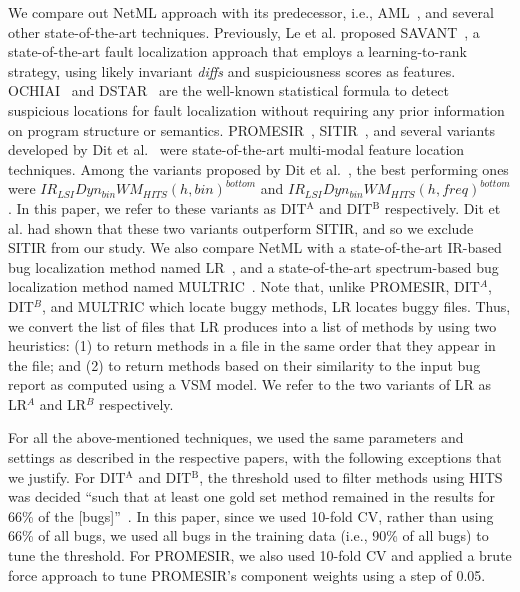 We compare out NetML approach with its predecessor, i.e., AML~\cite{Le:2015:IRS:2786805.2786880}, and several other state-of-the-art techniques. Previously, Le et al. proposed SAVANT~\cite{B.Le:2016:LBF:2931037.2931049}, a state-of-the-art fault localization approach that employs a learning-to-rank~\cite{svmrank} strategy, using likely invariant \textit{diffs} and suspiciousness scores as features. OCHIAI~\cite{Abreu:2007:ASF:1308173.1308264} and DSTAR~\cite{DBLP:journals/tr/WongDGL14} are the well-known statistical formula to detect suspicious locations for fault localization without requiring any prior information on program structure or semantics. PROMESIR~\cite{PoshyvanykGMAR07}, SITIR~\cite{LiuMPR07}, and several variants developed by Dit et al.~\cite{DitRP13} were state-of-the-art multi-modal feature location techniques. Among the variants proposed by Dit et al.~\cite{DitRP13}, the best performing ones were $IR_{LSI}Dyn_{bin}WM_{HITS}(h,bin)^{bottom}$ and  $IR_{LSI}Dyn_{bin}WM_{HITS}(h,freq)^{bottom}$. In this paper, we refer to these variants as DIT$^\text{A}$ and DIT$^\text{B}$ respectively. Dit et al. had shown that these two variants outperform SITIR, and so we exclude SITIR from our study. We also compare NetML with a state-of-the-art IR-based bug localization method named LR~\cite{YeBL14}, and a state-of-the-art spectrum-based bug localization method named MULTRIC~\cite{XuanM14}. Note that, unlike PROMESIR, DIT$^{A}$, DIT$^{B}$, and MULTRIC which locate buggy methods, LR locates buggy files. Thus, we convert the list of files that LR produces into a list of methods by using two heuristics: (1) to return methods in a file in the same order that they appear in the file; and (2) to return methods based on their similarity to the input bug report as computed using a VSM model. We refer to the two variants of LR as LR$^{A}$ and LR$^{B}$ respectively.


For all the above-mentioned techniques, we used the same parameters and settings as described in the respective papers, with the following exceptions that we justify. For DIT$^\text{A}$ and DIT$^\text{B}$, the threshold used to filter methods using HITS was decided ``such that at least one gold set method remained in the results for 66\% of the [bugs]''~\cite{DitRP13}. In this paper, since we used 10-fold CV, rather than using 66\% of all bugs, we used all bugs in the training data (i.e., 90\% of all bugs) to tune the threshold. For PROMESIR, we also used 10-fold CV and applied a brute force approach to tune PROMESIR's component weights using a step of 0.05.

